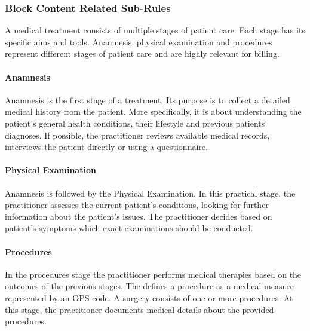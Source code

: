 \subsubsection{Block Content Related Sub-Rules}
A medical treatment consists of multiple stages of patient care.
Each stage has its specific aims and tools.
Anamnesis,
physical examination and procedures represent different stages of patient care and are highly relevant for billing.

\paragraph{Anamnesis}
Anamnesis is the first stage of a treatment.
Its purpose is to collect a detailed medical history from the patient\cite{lino2021medical}.
More specifically, it is about understanding the patient's general health conditions,
their lifestyle and previous patients' diagnoses.
If possible, the practitioner reviews available medical records,
interviews the patient directly or using a questionnaire\cite{zhang2011anamnevis}.

\paragraph{Physical Examination}
Anamnesis is followed by the Physical Examination.
In this practical stage, the practitioner assesses the current patient's conditions,
looking for further information about the patient's issues\cite{seidel2010mosby}.
The practitioner decides based on patient's symptoms which exact examinations should be conducted.

\paragraph{Procedures}
In the procedures stage the practitioner performs medical therapies based on the outcomes of the previous stages.
The \AVS defines a procedure as a medical measure represented by an OPS code.
A surgery consists of one or more procedures.
At this stage, the practitioner documents medical details about the provided procedures.

